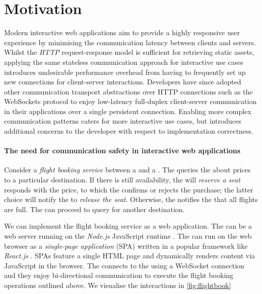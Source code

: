 \section{Motivation}
\label{section:intro}

Modern interactive web applications aim to 
provide a highly responsive user experience by 
minimising the communication latency between clients and servers. 
Whilst the \textit{HTTP} 
request-response model is 
sufficient for retrieving static assets, 
applying the same 
stateless communication approach for 
interactive use cases 
introduces 
undesirable performance overhead from having to 
frequently set up 
new connections for client-server interactions. 
Developers have since adopted other communication 
transport abstractions over HTTP connections such 
as the WebSockets protocol \cite{WebSocketRFC}
to enjoy low-latency full-duplex 
client-server communication in their applications over 
a single persistent connection. 
Enabling more complex communication patterns caters for 
more interactive use cases, but introduces additional 
concerns to the developer with respect to implementation correctness.

\paragraph{The need for communication safety 
in interactive web applications}

Consider a \textit{flight booking service}
between a  and a .
The  queries the 
about prices to a particular destination.
If there is still availability, 
the  will \textit{reserve a seat}
responds with the price,
to which the  confirms or rejects the purchase;
the latter choice will notify the 
to \textit{release the seat}.
Otherwise, the  notifies the
 that all flights are full.
The  can proceed to query for another
destination.

We can implement the flight booking service as a web
application.
The  can be a web server
running on the \textit{Node.js} JavaScript runtime \cite{nodejs}.
The  can run on the web browser
as a \textit{single-page application} (SPA) written
in a popular framework like \textit{React.js} \cite{React}.
SPAs feature a single HTML page and dynamically renders
content via JavaScript in the browser.
The  connects to the 
using a WebSocket connection and they enjoy
bi-directional communication to execute the flight
booking operations outlined above.
We visualise the interactions in \cref{fig:flightbook}

